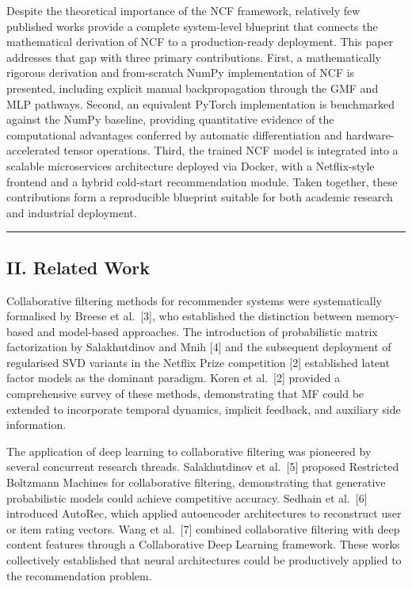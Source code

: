 \documentclass[
]{IEEEtran}
\begin{document}
Despite the theoretical importance of the NCF framework, relatively few
published works provide a complete system-level blueprint that connects
the mathematical derivation of NCF to a production-ready deployment.
This paper addresses that gap with three primary contributions. First, a
mathematically rigorous derivation and from-scratch NumPy implementation
of NCF is presented, including explicit manual backpropagation through
the GMF and MLP pathways. Second, an equivalent PyTorch implementation
is benchmarked against the NumPy baseline, providing quantitative
evidence of the computational advantages conferred by automatic
differentiation and hardware-accelerated tensor operations. Third, the
trained NCF model is integrated into a scalable microservices
architecture deployed via Docker, with a Netflix-style frontend and a
hybrid cold-start recommendation module. Taken together, these
contributions form a reproducible blueprint suitable for both academic
research and industrial deployment.

\begin{center}\rule{0.5\linewidth}{0.5pt}\end{center}

\subsection{II. Related Work}\label{ii.-related-work}

Collaborative filtering methods for recommender systems were
systematically formalised by Breese et al.~{[}3{]}, who established the
distinction between memory-based and model-based approaches. The
introduction of probabilistic matrix factorization by Salakhutdinov and
Mnih {[}4{]} and the subsequent deployment of regularised SVD variants
in the Netflix Prize competition {[}2{]} established latent factor
models as the dominant paradigm. Koren et al.~{[}2{]} provided a
comprehensive survey of these methods, demonstrating that MF could be
extended to incorporate temporal dynamics, implicit feedback, and
auxiliary side information.

The application of deep learning to collaborative filtering was
pioneered by several concurrent research threads. Salakhutdinov et
al.~{[}5{]} proposed Restricted Boltzmann Machines for collaborative
filtering, demonstrating that generative probabilistic models could
achieve competitive accuracy. Sedhain et al.~{[}6{]} introduced AutoRec,
which applied autoencoder architectures to reconstruct user or item
rating vectors. Wang et al.~{[}7{]} combined collaborative filtering
with deep content features through a Collaborative Deep Learning
framework. These works collectively established that neural
architectures could be productively applied to the recommendation
problem.
\end{document}
